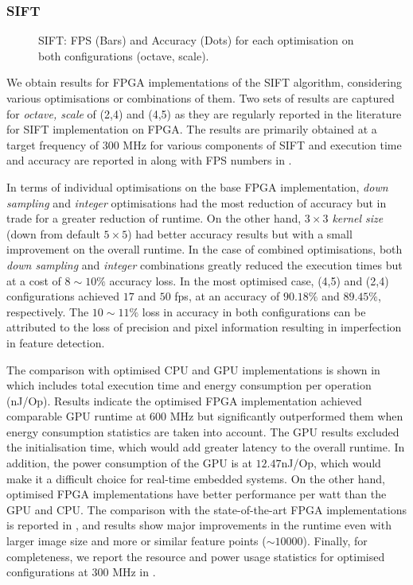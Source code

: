 \subsubsection{SIFT}

\begin{figure}[h]
    \centering
\resizebox{\columnwidth}{!}{}    %
    \caption[SIFT: FPS and Accuracy]{SIFT: FPS (Bars) and Accuracy (Dots) for each optimisation on both configurations (octave, scale).}
    \label{fig:ResAccGraph}
\end{figure}

We obtain results for FPGA implementations of the SIFT algorithm, considering various optimisations or combinations of them. Two sets of results are captured for \textit{octave, scale} of (2,4) and (4,5) as they are regularly reported in the literature for SIFT implementation on FPGA. The results are primarily obtained at a target frequency of 300 MHz for various components of SIFT and execution time and accuracy are reported in  along with FPS numbers in . 

In terms of individual optimisations on the base FPGA implementation, \textit{down sampling} and \textit{integer} optimisations had the most reduction of accuracy but in trade for a greater reduction of runtime. On the other hand, \textit{$3\times3$ kernel size} (down from default $5\times 5$) had better accuracy results but with a small improvement on the overall runtime. In the case of combined optimisations, both \textit{down sampling} and \textit{integer} combinations greatly reduced the execution times but at a cost of $8\sim10\%$ accuracy loss. In the most optimised case, (4,5) and (2,4) configurations achieved $17$ and $50$ fps, at an accuracy of $90.18\%$ and $89.45\%$, respectively. The $10 \sim 11\%$ loss in accuracy in both configurations can be attributed to the loss of precision and pixel information resulting in imperfection in feature detection.

The comparison with optimised CPU and GPU implementations is shown in   which includes total execution time and energy consumption per operation (nJ/Op). Results indicate the optimised FPGA implementation achieved comparable GPU runtime at 600 MHz but significantly outperformed them when energy consumption statistics are taken into account. The GPU results excluded the initialisation time, which would add greater latency to the overall runtime. In addition, the power consumption of the GPU is at $12.47$nJ/Op, which would make it a difficult choice for real-time embedded systems. On the other hand, optimised FPGA implementations have better performance per watt than the GPU and CPU. The comparison with the state-of-the-art FPGA implementations is reported in , and results show major improvements in the runtime even with larger image size and more or similar feature points ($\sim10000$). Finally, for completeness, we report the resource and power usage statistics for optimised configurations at 300 MHz in .


